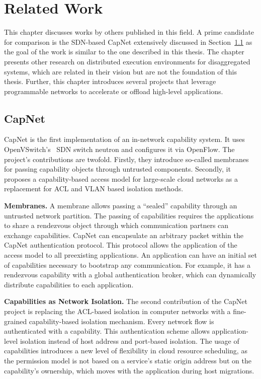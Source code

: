 %
\chapter{Related Work}%
\label{sec:related-work}\thispagestyle{scrheadings}
This chapter discusses works by others published in this field. A prime candidate for comparison is the \ac{SDN}-based CapNet extensively discussed in Section~\ref{sec:capnet} as the goal of the work is similar to the one described in this thesis. The chapter presents other research on distributed execution environments for disaggregated systems, which are related in their vision but are not the foundation of this thesis. Further, this chapter introduces several projects that leverage programmable networks to accelerate or offload high-level applications.

\section{CapNet}%
\label{sec:capnet}
CapNet is the first implementation of an in-network capability system. It uses OpenVSwitch's~\cite{pfaffDesignImplementationOpen} \ac{SDN} switch neutron and configures it via OpenFlow. The project's contributions are twofold. Firstly, they introduce so-called membranes for passing capability objects through untrusted components. Secondly, it proposes a capability-based access model for large-scale cloud networks as a replacement for \ac{ACL} and \ac{VLAN} based isolation methods.

\textbf{Membranes.} A membrane allows passing a \enquote{sealed} capability through an untrusted network partition. The passing of capabilities requires the applications to share a rendezvous object through which communication partners can exchange capabilities.
CapNet can encapsulate an arbitrary packet within the CapNet authentication protocol. This protocol allows the application of the access model to all preexisting applications. An application can have an initial set of capabilities necessary to bootstrap any communication. For example, it has a rendezvous capability with a global authentication broker, which can dynamically distribute capabilities to each application.

\textbf{Capabilities as Network Isolation.} The second contribution of the CapNet project is replacing the \ac{ACL}-based isolation in computer networks with a fine-grained capability-based isolation mechanism. Every network flow is authenticated with a capability. This authentication scheme allows application-level isolation instead of host address and port-based isolation. The usage of capabilities introduces a new level of flexibility in cloud resource scheduling, as the permission model is not based on a service's static origin address but on the capability's ownership, which moves with the application during host migrations.


